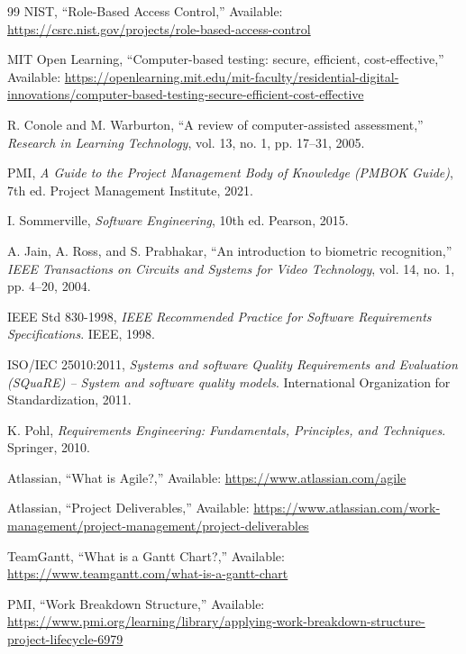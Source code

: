 \begin{thebibliography}{99}
 NIST, ``Role-Based Access Control,'' Available: \url{https://csrc.nist.gov/projects/role-based-access-control}

 MIT Open Learning, ``Computer-based testing: secure, efficient, cost-effective,'' Available: \url{https://openlearning.mit.edu/mit-faculty/residential-digital-innovations/computer-based-testing-secure-efficient-cost-effective}

 R. Conole and M. Warburton, ``A review of computer-assisted assessment,'' \textit{Research in Learning Technology}, vol. 13, no. 1, pp. 17--31, 2005.

 PMI, \textit{A Guide to the Project Management Body of Knowledge (PMBOK Guide)}, 7th ed. Project Management Institute, 2021.

 I. Sommerville, \textit{Software Engineering}, 10th ed. Pearson, 2015.

 A. Jain, A. Ross, and S. Prabhakar, ``An introduction to biometric recognition,'' \textit{IEEE Transactions on Circuits and Systems for Video Technology}, vol. 14, no. 1, pp. 4--20, 2004.

 IEEE Std 830-1998, \textit{IEEE Recommended Practice for Software Requirements Specifications}. IEEE, 1998.

 ISO/IEC 25010:2011, \textit{Systems and software Quality Requirements and Evaluation (SQuaRE) -- System and software quality models}. International Organization for Standardization, 2011.

 K. Pohl, \textit{Requirements Engineering: Fundamentals, Principles, and Techniques}. Springer, 2010.

 Atlassian, ``What is Agile?,'' Available: \url{https://www.atlassian.com/agile}

 Atlassian, ``Project Deliverables,'' Available: \url{https://www.atlassian.com/work-management/project-management/project-deliverables}

 TeamGantt, ``What is a Gantt Chart?,'' Available: \url{https://www.teamgantt.com/what-is-a-gantt-chart}

 PMI, ``Work Breakdown Structure,'' Available: \url{https://www.pmi.org/learning/library/applying-work-breakdown-structure-project-lifecycle-6979}


\end{thebibliography}
